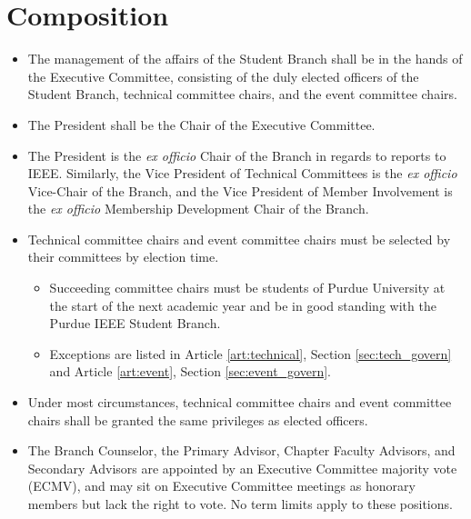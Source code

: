 \documentclass[12pt]{constitution}
\begin{document}
\section{Composition}
\label{sec:exec_comp}
\begin{itemize}
    \item The management of the affairs of the Student Branch shall be in the hands of the Executive Committee, consisting of the duly elected officers of the Student Branch, technical committee chairs, and the event committee chairs.
    \item The President shall be the Chair of the Executive Committee.
    \item The President is the \textit{ex officio} Chair of the Branch in regards to reports to IEEE. Similarly, the Vice President of Technical Committees is the \textit{ex officio} Vice-Chair of the Branch, and the Vice President of Member Involvement is the \textit{ex officio} Membership Development Chair of the Branch.
    \item Technical committee chairs and event committee chairs must be selected by their committees by election time.
    \begin{itemize}
        \item Succeeding committee chairs must be students of Purdue University at the start of the next academic year and be in good standing with the Purdue IEEE Student Branch.
        \item Exceptions are listed in Article \ref{art:technical}, Section \ref{sec:tech_govern} and Article \ref{art:event}, Section \ref{sec:event_govern}.
    \end{itemize}
    \item Under most circumstances, technical committee chairs and event committee chairs shall be granted the same privileges as elected officers.
    \item The Branch Counselor, the Primary Advisor, Chapter Faculty Advisors, and Secondary Advisors are appointed by an Executive Committee majority vote (ECMV), and may sit on Executive Committee meetings as honorary members but lack the right to vote. No term limits apply to these positions.
\end{itemize}
\end{document}
